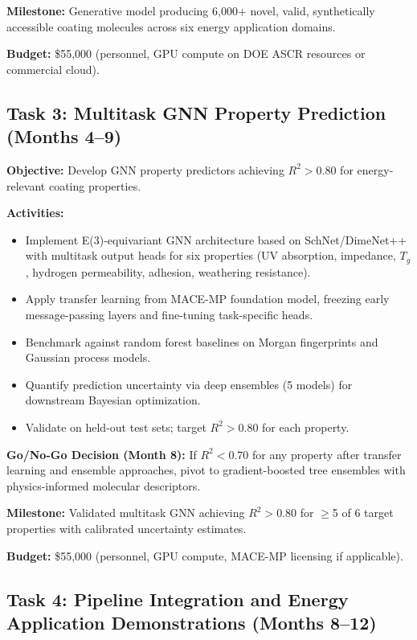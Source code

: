 \documentclass[11pt,letterpaper]{article}
\begin{document}
\textbf{Milestone:} Generative model producing 6,000+ novel, valid, synthetically accessible coating molecules across six energy application domains.

\textbf{Budget:} \$55,000 (personnel, GPU compute on DOE ASCR resources or commercial cloud).

\subsection{Task 3: Multitask GNN Property Prediction (Months 4--9)}

\textbf{Objective:} Develop GNN property predictors achieving $R^2 > 0.80$ for energy-relevant coating properties.

\textbf{Activities:}
\begin{itemize}[noitemsep]
  \item Implement E(3)-equivariant GNN architecture based on SchNet/DimeNet++ with multitask output heads for six properties (UV absorption, impedance, $T_g$, hydrogen permeability, adhesion, weathering resistance).
  \item Apply transfer learning from MACE-MP foundation model, freezing early message-passing layers and fine-tuning task-specific heads.
  \item Benchmark against random forest baselines on Morgan fingerprints and Gaussian process models.
  \item Quantify prediction uncertainty via deep ensembles (5 models) for downstream Bayesian optimization.
  \item Validate on held-out test sets; target $R^2 > 0.80$ for each property.
\end{itemize}

\textbf{Go/No-Go Decision (Month 8):} If $R^2 < 0.70$ for any property after transfer learning and ensemble approaches, pivot to gradient-boosted tree ensembles with physics-informed molecular descriptors.

\textbf{Milestone:} Validated multitask GNN achieving $R^2 > 0.80$ for $\geq$5 of 6 target properties with calibrated uncertainty estimates.

\textbf{Budget:} \$55,000 (personnel, GPU compute, MACE-MP licensing if applicable).

\subsection{Task 4: Pipeline Integration and Energy Application Demonstrations (Months 8--12)}
\end{document}
